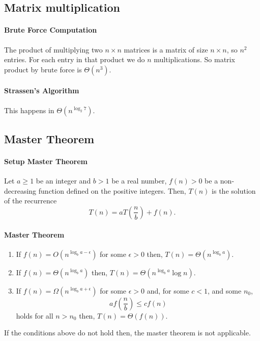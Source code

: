 \subsection{Matrix multiplication}
\paragraph{Brute Force Computation} 
The product of multiplying two \(n \times n\) matrices is  a matrix 
of size \(n \times n\), so \(n^2\) entries. For each entry in that product 
we do \(n\) multiplications. So matrix product by brute force is \(\Theta(n^3)\).

\paragraph{Strassen's Algorithm}
This happens in \(\Theta(n^{\log_2 7})\).

\subsection{Master Theorem}

\paragraph{Setup Master Theorem}
Let \(a \geq 1\)  be an integer and \(b > 1\) be a real number,
\(f(n) > 0\) be a non-decreasing function defined on the positive integers.
Then, \(T(n)\) is the solution of the recurrence
\[T(n) = a T\left( \frac{n}{b} \right) + f(n).\]

\paragraph{Master Theorem}
\begin{enumerate}
    \item If \(f(n) = O(n^{\log_b a-\epsilon})\) for some \(\epsilon > 0\) then,
    \(T(n) = \Theta(n^{\log_b a})\).
    \item If \(f(n) = \Theta(n^{\log_b a})\) then,
    \(T(n) = \Theta (n^{\log_b a}\log n)\).
    \item  If \(f(n) = \Omega(n^{\log_b a + \epsilon})\) for some \(\epsilon > 0\)
    and, for some \(c < 1\), and some \(n_0\),
    \[a f(\frac{n}{b}) \leq c f(n)\]
    holds for all \(n > n_0\) then, \(T(n) = \Theta(f(n))\).
\end{enumerate}
If the conditions above do not hold then, the master theorem is not
applicable.


